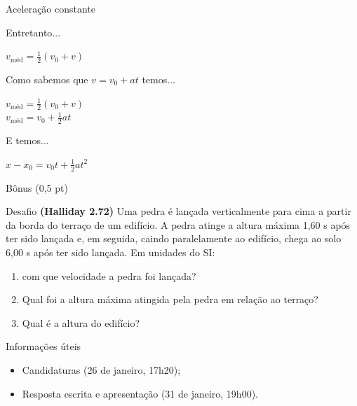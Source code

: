 \documentclass[xcolor=dvipsnames,table]{beamer}
\begin{document}
		\begin{frame}{Aceleração constante}
		\begin{block}{Entretanto...}
			\begin{center}
				$v_{\mbox{méd}} = \frac{1}{2}(v_0 + v)$
			\end{center}
			Como sabemos que $v = v_0 + at$ temos...
			\begin{center}
				$v_{\mbox{méd}} = \frac{1}{2}(v_0 + v)$ \\
				$v_{\mbox{méd}} = v_0 + \frac{1}{2} at$
			\end{center}
			E temos...
			\begin{center}
				$x - x_0 = v_0t + \frac{1}{2}at^2$
			\end{center}
		\end{block}
	\end{frame}

	


	
	\begin{frame}[shrink]{Bônus (0,5 pt)}
		\begin{block}{Desafio}
			{\bf (Halliday 2.72)} Uma pedra é lançada verticalmente para cima a partir da borda do terraço de um edifício. A pedra atinge a altura máxima 1,60 s após ter sido lançada e, em seguida, caindo paralelamente ao edifício, chega ao solo 6,00 s após ter sido lançada. Em unidades do SI:
			\begin{enumerate}
				\item com que velocidade a pedra foi lançada? 
				\item Qual foi a altura máxima atingida pela pedra em relação ao terraço? 
				\item Qual é a altura do edifício?
			\end{enumerate}
		\end{block}
		\begin{block}{Informações úteis}
			\begin{itemize}
                \item Candidaturas (26 de janeiro, 17h20);
                \item Resposta escrita e apresentação (31 de janeiro, 19h00).
			\end{itemize}
		\end{block} 
	\end{frame}
	
	\begin{frame}
		\titlepage
	\end{frame}
	
\end{document}
